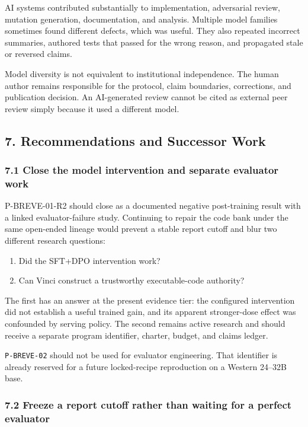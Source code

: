 \documentclass[
]{article}
\providecommand{\tightlist}{%
  \setlength{\itemsep}{0pt}\setlength{\parskip}{0pt}}
\begin{document}
AI systems contributed substantially to implementation, adversarial
review, mutation generation, documentation, and analysis. Multiple model
families sometimes found different defects, which was useful. They also
repeated incorrect summaries, authored tests that passed for the wrong
reason, and propagated stale or reversed claims.

Model diversity is not equivalent to institutional independence. The
human author remains responsible for the protocol, claim boundaries,
corrections, and publication decision. An AI-generated review cannot be
cited as external peer review simply because it used a different model.

\subsection{7. Recommendations and Successor
Work}\label{7-recommendations-and-successor-work}

\subsubsection{7.1 Close the model intervention and separate evaluator
work}\label{71-close-the-model-intervention-and-separate-evaluator-work}

P-BREVE-01-R2 should close as a documented negative post-training result
with a linked evaluator-failure study. Continuing to repair the code
bank under the same open-ended lineage would prevent a stable report
cutoff and blur two different research questions:

\begin{enumerate}
\def\labelenumi{\arabic{enumi}.}
\tightlist
\item
  Did the SFT+DPO intervention work?
\item
  Can Vinci construct a trustworthy executable-code authority?
\end{enumerate}

The first has an answer at the present evidence tier: the configured
intervention did not establish a useful trained gain, and its apparent
stronger-dose effect was confounded by serving policy. The second
remains active research and should receive a separate program
identifier, charter, budget, and claims ledger.

\texttt{P-BREVE-02} should not be used for evaluator engineering. That
identifier is already reserved for a future locked-recipe reproduction
on a Western 24--32B base.

\subsubsection{7.2 Freeze a report cutoff rather than waiting for a
perfect
evaluator}\label{72-freeze-a-report-cutoff-rather-than-waiting-for-a-perfect-evaluator}
\end{document}
